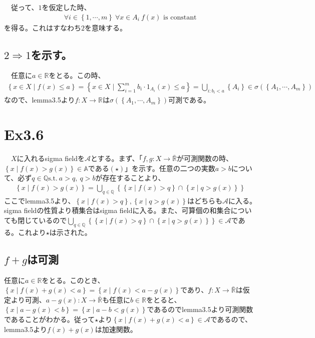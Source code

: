 \documentclass{article}
\begin{document}
　従って、$1$を仮定した時、
\begin{align*}
\forall i\in \left\{ 1, \cdots, m\right\}\ \forall x \in A_i\ f(x) \text{\ is constant}
\end{align*}
を得る。これはすなわち$2$を意味する。

\subsection{$2\Rightarrow 1$を示す。}
　任意に$a\in \mathbb{R}$をとる。この時、
\begin{align*}
	\left\{ x\in X \mid f(x)\leq a \right\}  = \left\{ x\in X \mid \sum_{i=1}^{m} b_i \cdot 1_{A_i}(x) \leq a \right\} = \bigcup_{i:b_i < a} \left\{ A_i \right\} \in \sigma\left( \left\{ A_1, \cdots, A_m\right\} \right)
\end{align*}
なので、lemma3.5より$f:X\to\mathbb{R}$は$\sigma\left( \left\{ A_1, \cdots, A_m\right\} \right)$可測である。

\section{Ex3.6}
　$X$に入れるsigma fieldを$\mathcal{A}$とする。まず、「$f, g:X \to \bar{\mathbb{R}}$が可測関数の時、$\left\{ x\mid f(x) > g(x) \right\} \in \mathbb{A}$である$(\star)$」を示す。任意の二つの実数$a > b$について、必ず$q\in \mathbb{Q} \text{s.t.}\ a>q,\ q>b$が存在することより、
\begin{align*}
	\left\{ x\mid f(x) > g(x) \right\} = \bigcup_{q\in \mathbb{Q}} \left\{ \left\{ x\mid f(x) > q \right\} \cap \left\{ x\mid q > g(x) \right\} \right\}
\end{align*}
ここでlemma3.5より、$\left\{ x\mid f(x) > q \right\}, \left\{ x\mid q > g(x) \right\}$はどちらも$\mathcal{A}$に入る。sigma fieldの性質より積集合はsigma fieldに入る。また、可算個の和集合についても閉じているので$\bigcup_{q\in \mathbb{Q}} \left\{ \left\{ x\mid f(x) > q \right\} \cap \left\{ x\mid q > g(x) \right\} \right\} \in \mathcal{A}$である。これより$\star$は示された。
　\subsection{$f+g$は可測}
	任意に$a\in \mathbb{R}$をとる。このとき、$\left\{ x\mid f(x) + g(x) < a \right\} = \left\{ x\mid f(x) < a-g(x)\right\}$であり、$f:X\to \bar{\mathbb{R}}$は仮定より可測、$a-g(x):X\to \bar{\mathbb{R}}$も任意に$b \in \mathbb{R}$をとると、$\left\{ x\mid a-g(x) < b \right\} = \left\{ x\mid a -b < g(x) \right\}$であるのでlemma3.5より可測関数であることがわかる。従って$\star$より$\left\{ x\mid f(x) + g(x) < a \right\}\in \mathcal{A}$であるので、lemma3.5より$f(x) + g(x)$は加速関数。
\end{document}
